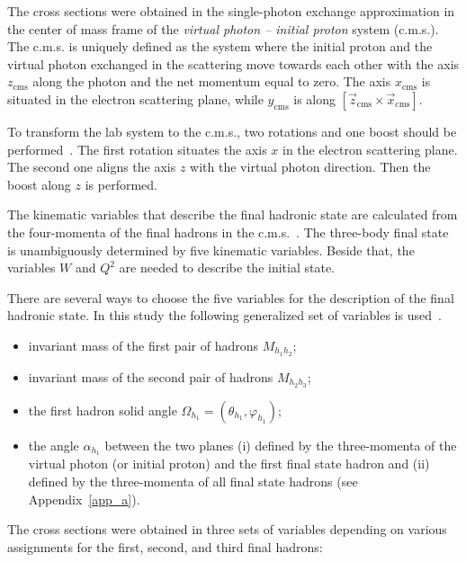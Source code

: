 \documentclass[prc,twocolumn,superscriptaddress,showpacs,amssymb,amsmath,amsfonts,aps,nofootinbib]{revtex4-1}
\begin{document}
The cross sections were obtained in the single-photon exchange approximation in the center of mass frame of the {\em virtual photon -- initial proton} system (c.m.s.).   
The c.m.s. is uniquely defined as the system where the initial proton and the virtual photon exchanged in the scattering move towards each other with the axis $z_{\text{cms}}$ along the photon and the net momentum equal to zero. The axis $x_{\text{cms}}$ is situated in the electron scattering plane, while $y_{\text{cms}}$ is along $[\vec z_{\text{cms}} \times \vec x_{\text{cms}}]$.

To transform the lab system to the c.m.s., two rotations and one
boost should be performed~\cite{Fed_an_note:2017}.
The first rotation situates the axis $x$ in the electron scattering plane.
The second one aligns the axis $z$ with the virtual photon direction. 
Then the boost along $z$ is performed. 


The kinematic variables that describe the final hadronic state are calculated from the four-momenta of the final hadrons in the c.m.s.~\cite{Isupov:2017lnd,Fedotov:2008aa}.
The three-body final state is 
unambiguously determined by five kinematic
variables. 
Beside that, the variables $W$ and $Q^{2}$ are needed to describe the initial state.
 
There are several ways to choose the five variables for the description of the final hadronic state. In this study the following generalized set of
variables is used~\cite{Fed_an_note:2017,Byckling:1971vca,Isupov:2017lnd,Fedotov:2008aa,Mokeev:2015lda}.

\begin{itemize}
\item invariant mass of the first pair of 
hadrons $M_{h_{1}h_{2}}$;
\item invariant mass of the second pair of
hadrons $M_{h_{2}h_{3}}$;
\item the first hadron solid angle $\Omega_{h_{1}} = (\theta_{h_{1}}, \varphi_{h_{1}})$;
\item the angle $\alpha_{h_{1}}$ between the two planes (i) defined by the three-momenta of
the virtual photon (or initial proton) and the first final state hadron and (ii) defined by the three-momenta of all final state hadrons (see Appendix~\ref{app_a}).
\end{itemize}



The cross sections  were obtained in three sets of variables depending on
various assignments for the first, second, and
third final hadrons:
\end{document}
